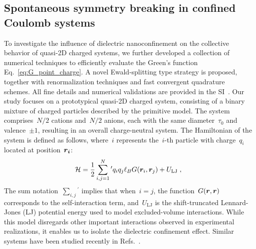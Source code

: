 \subsection{Spontaneous symmetry breaking in confined Coulomb systems}

To investigate the influence of dielectric nanoconfinement on the collective behavior of quasi-2D charged systems, we further developed a collection of numerical techniques to efficiently evaluate the Green's function Eq.~\eqref{eq:G_point_charge}. A novel Ewald-splitting type strategy is proposed, together with renormalization techniques and fast convergent quadrature schemes. All fine details and numerical validations are provided in the SI~\cite{SI}.
Our study focuses on a prototypical quasi-2D charged system, consisting of a binary mixture of charged particles described by the primitive model.
The system comprises~$N/2$ cations and~$N/2$ anions, each with the same diameter~$\tau_0$ and valence~$\pm 1$, resulting in an overall charge-neutral system. 
The Hamiltonian of the system is defined as follows, where~$i$ represents the~$i$-th particle with charge~$q_i$ located at position~$\boldsymbol{r_i}$:
\begin{equation}
   \mathcal H = \frac{1}{2} \sum_{i,j=1}^{N}{}^\prime q_i q_j \ell_B G(\boldsymbol{r}_i, \boldsymbol{r}_j) + U_{\mathrm{LJ}}\;,\label{eq:Hamiltonian}
\end{equation}
The sum notation~$\sum_{i,j}{}^\prime$ implies that when~$i=j$, the function~$G(\boldsymbol{r}, \boldsymbol{r})$ corresponds to the self-interaction term, and~$U_{\mathrm{LJ}}$ is the shift-truncated Lennard-Jones (LJ) potential energy used to model excluded-volume interactions. 
While this model disregards other important interactions observed in experimental realizations, it enables us to isolate the dielectric confinement effect. 
Similar systems have been studied recently in Refs.~\cite{dos2017simulations,liang2020harmonic,yuan2021particle}.


